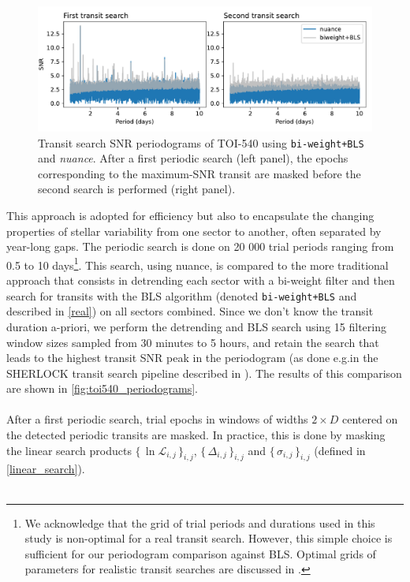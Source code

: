 \documentclass[modern]{aastex631}
\newcommand{\nuancemethod}{\textit{nuance}}
\newcommand{\nuance}{\nuancemethod{}}
\newcommand{\nuancecode}{\textsf{nuance}}
\newcommand{\set}[1]{\{\,#1\,\}}
\begin{document}
\begin{figure}[H]
    \begin{centering}
        \includegraphics[width=\linewidth]{../workflows/comparison_toi/figures/TOI 540/periodograms.pdf} 
        \caption{Transit search SNR periodograms of TOI-540 using \texttt{bi-weight+BLS} and \nuance{}. After a first periodic search (left panel), the epochs corresponding to the maximum-SNR transit are masked before the second search is performed (right panel).}
        \label{fig:toi540_periodograms}
    \end{centering}
\end{figure}
This approach is adopted for efficiency but also to encapsulate the changing properties of stellar variability from one sector to another, often separated by year-long gaps. The periodic search is done on 20 000 trial periods ranging from 0.5 to 10 days\footnote{We acknowledge that the grid of trial periods and durations used in this study is non-optimal for a real transit search. However, this simple choice is sufficient for our periodogram comparison against BLS. Optimal grids of parameters for realistic transit searches are discussed in \cite{tls}.}. This search, using \nuancecode{}, is compared to the more traditional approach that consists in detrending each sector with a bi-weight filter and then search for transits with the \textsf{BLS} algorithm (denoted \texttt{bi-weight+BLS} and described in \autoref{real}) on all sectors combined. Since we don't know the transit duration a-priori, we perform the detrending and \textsf{BLS} search using 15 filtering window sizes sampled from 30 minutes to 5 hours, and retain the search that leads to the highest transit SNR peak in the periodogram (as done e.g.\;in the SHERLOCK transit search pipeline described in \citealt{Pozuelos2020}). The results of this comparison are shown in \autoref{fig:toi540_periodograms}.\\\\
After a first periodic search, trial epochs in windows of widths $2\times D$ centered on the detected periodic transits are masked. In practice, this is done by masking the linear search products $\set{\ln\mathcal{L}_{i,j}}_{i, j}$, $\set{\Delta_{i,j}}_{i, j}$ and $\set{\sigma_{i,j}}_{i, j}$ (defined in \autoref{linear_search}).\\\\
\end{document}

